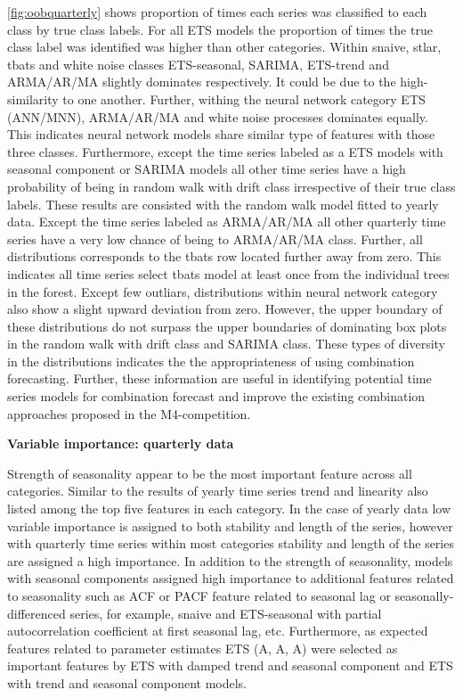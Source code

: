 \documentclass[11pt,a4paper,]{article}
\theoremstyle{definition}
\theoremstyle{definition}
\theoremstyle{definition}
\theoremstyle{remark}
\begin{document}
\autoref{fig:oobquarterly} shows proportion of times each series was
classified to each class by true class labels. For all ETS models the
proportion of times the true class label was identified was higher than
other categories. Within snaive, stlar, tbats and white noise classes
ETS-seasonal, SARIMA, ETS-trend and ARMA/AR/MA slightly dominates
respectively. It could be due to the high-similarity to one another.
Further, withing the neural network category ETS (ANN/MNN), ARMA/AR/MA
and white noise processes dominates equally. This indicates neural
network models share similar type of features with those three classes.
Furthermore, except the time series labeled as a ETS models with
seasonal component or SARIMA models all other time series have a high
probability of being in random walk with drift class irrespective of
their true class labels. These results are consisted with the random
walk model fitted to yearly data. Except the time series labeled as
ARMA/AR/MA all other quarterly time series have a very low chance of
being to ARMA/AR/MA class. Further, all distributions corresponds to the
tbats row located further away from zero. This indicates all time series
select tbats model at least once from the individual trees in the
forest. Except few outliars, distributions within neural network
category also show a slight upward deviation from zero. However, the
upper boundary of these distributions do not surpass the upper
boundaries of dominating box plots in the random walk with drift class
and SARIMA class. These types of diversity in the distributions
indicates the the appropriateness of using combination forecasting.
Further, these information are useful in identifying potential time
series models for combination forecast and improve the existing
combination approaches proposed in the M4-competition.

\textbf{Variable importance: quarterly data}

Strength of seasonality appear to be the most important feature across
all categories. Similar to the results of yearly time series trend and
linearity also listed among the top five features in each category. In
the case of yearly data low variable importance is assigned to both
stability and length of the series, however with quarterly time series
within most categories stability and length of the series are assigned a
high importance. In addition to the strength of seasonality, models with
seasonal components assigned high importance to additional features
related to seasonality such as ACF or PACF feature related to seasonal
lag or seasonally-differenced series, for example, snaive and
ETS-seasonal with partial autocorrelation coefficient at first seasonal
lag, etc. Furthermore, as expected features related to parameter
estimates ETS (A, A, A) were selected as important features by ETS with
damped trend and seasonal component and ETS with trend and seasonal
component models.
\end{document}
